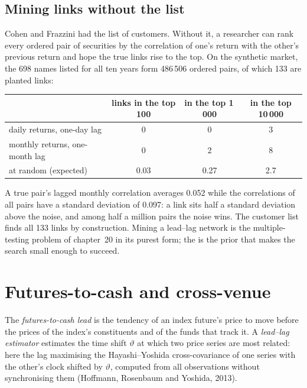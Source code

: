 \subsection{Mining links without the list}

Cohen and Frazzini had the list of customers. Without it, a researcher can rank every ordered pair of securities by the correlation
of one's return with the other's previous return and hope the true links rise to the top. On the synthetic market, the 698 names
listed for all ten years form 486\,506 ordered pairs, of which 133 are planted links:

\begin{center}
\small
\begin{tabular}{@{}lccc@{}}
\toprule
 & links in the top 100 & in the top 1\,000 & in the top 10\,000\\
\midrule
daily returns, one-day lag & 0 & 0 & 3\\
monthly returns, one-month lag & 0 & 2 & 8\\
at random (expected) & 0.03 & 0.27 & 2.7\\
\bottomrule
\end{tabular}
\end{center}

A true pair's lagged monthly correlation averages 0.052 while the correlations of all pairs have a standard deviation of 0.097: a
link sits half a standard deviation above the noise, and among half a million pairs the noise wins. The customer list finds all 133
links by construction. Mining a lead--lag network is the multiple-testing problem of chapter~20 in its purest form; the  is the prior that makes the search small enough to succeed.

\section{Futures-to-cash and cross-venue}

\begin{definition}\label{def:rs:cross-sectional-and-cross-asset-features:estimator}
The \emph{futures-to-cash lead} is the tendency of an index future's price to move before the prices
of the index's constituents and of the funds that track it. A \emph{lead--lag estimator} estimates the
time shift $\vartheta$ at which two price series are most related: here the lag maximising the Hayashi--Yoshida cross-covariance of
one series with the other's clock shifted by $\vartheta$, computed from all observations without synchronising them (Hoffmann,
Rosenbaum and Yoshida, 2013).
\end{definition}

